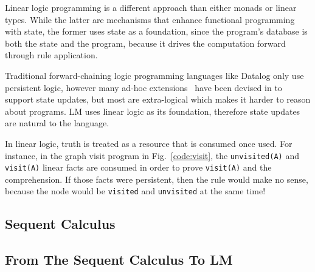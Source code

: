 Linear logic programming is a different approach than either monads or linear
types.  While the latter are mechanisms that enhance functional programming with
state, the former uses state as a foundation, since the program's database is
both the state and the program, because it drives the computation forward
through rule application.

Traditional forward-chaining logic programming languages like
Datalog only use persistent logic, however many ad-hoc
extensions~\cite{Liu98extendingdatalog,Ludascher95alogical} have been devised
in to support state updates, but most are extra-logical which makes it harder
to reason about programs. LM uses linear logic as its foundation, therefore
state updates are natural to the language.

In linear logic, truth is treated as a resource that is consumed once used. For
instance, in the graph visit program in Fig.~\ref{code:visit}, the
\texttt{unvisited(A)} and \texttt{visit(A)} linear facts are consumed in order
to prove \texttt{visit(A)} and the comprehension. If those facts were
persistent, then the rule would make no sense, because the node would be
\texttt{visited} and \texttt{unvisited} at the same time!

\subsection{Sequent Calculus}



\subsection{From The Sequent Calculus To LM}

